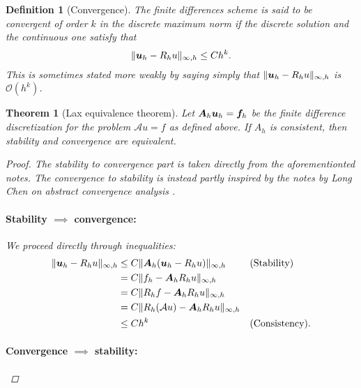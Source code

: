 \documentclass{article}
\renewcommand{\vec}{\vectorsym}
\newcommand{\mat}{\matrixsym}
\newtheorem{definition}{Definition}
\newtheorem{theorem}{Theorem}
\begin{document}
\begin{definition}[Convergence]
    The finite differences scheme is said to be convergent of order $k$ in the discrete maximum norm if the discrete solution and the continuous one satisfy that 
    $$ \| \vec u_h - R_hu \|_{\infty,h} \leq C h^k. $$
This is sometimes stated more weakly by saying simply that $\| \vec u_h - R_hu \|_{\infty,h}$ is $\mathcal O(h^k)$. 
\end{definition}

\begin{theorem}[Lax equivalence theorem]
    Let $ \mat A_h \vec u_h = \vec f_h$ be the finite difference discretization for the problem $\mathcal A u = f$ as defined above. If $A_h$ is consistent, then stability and convergence are equivalent. 
    \begin{proof}
        The stability to convergence part is taken directly from the aforementionted notes. The convergence to stability is instead partly inspired by the notes by Long Chen on abstract convergence analysis \cite{chenLFDM}.
        
        \paragraph{Stability $\implies$ convergence:}

        We proceed directly through inequalities:
        \begin{align*}
            \| \vec u_h - R_h u\|_{\infty,h} &\leq C\|\mat A_h(\vec u_h - R_hu) \|_{\infty,h} && \text{(Stability)} \\
                                             &=C \| f_h - \mat A_hR_h u \|_{\infty,h} && \\
                                             &=C \| R_h f - \mat A_hR_h u\|_{\infty,h} &&\\
                                             &=C \|R_h(\mathcal A u) - \mat A_hR_h u\|_{\infty,h}&& \\
                                             &\leq Ch^k && \text{(Consistency)}.
        \end{align*}

        \paragraph{Convergence $\implies$ stability:}


\end{proof}
\end{theorem}
\end{document}
